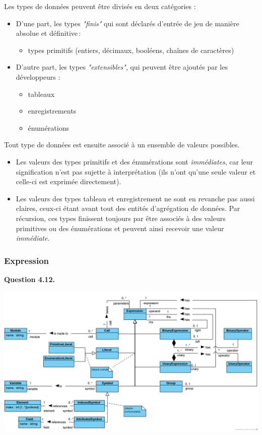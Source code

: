 \documentclass[oneside,a4paper]{book}
\begin{document}
\begin{samepage}
    Les types de données peuvent être divisés en deux catégories :
    \begin{itemize}
        \item D'une part, les types \textit{"finis"} qui sont déclarés d'entrée de jeu de manière absolue et définitive\,: 
        \begin{itemize}
            \item types primitifs (entiers, décimaux, booléens, chaînes de caractères)
        \end{itemize}
        \item D'autre part, les types \textit{"extensibles"}, qui peuvent être ajoutés par les développeurs : 
        \begin{itemize}
            \item tableaux
            \item enregistrements
            \item énumérations
        \end{itemize} 
    \end{itemize}
\end{samepage}

Tout type de données est ensuite associé à un ensemble de valeurs possibles.
\begin{itemize}
    \item Les valeurs des types primitifs et des énumérations sont \textit{immédiates}, car leur signification n'est pas sujette à interprétation (ils n'ont qu'une seule valeur et celle-ci est exprimée directement).
    \item Les valeurs des types tableau et enregistrement ne sont en revanche pas aussi claires, ceux-ci étant avant tout des entités d'agrégation de données. Par récursion, ces types finissent toujours par être associés à des valeurs primitives ou des énumérations et peuvent ainsi recevoir une valeur \textit{immédiate}.
\end{itemize}

\subsubsection{Expression}

\textbf{Question 4.12.}\label{Question 4.12.}\newline

\nopagebreak 

\includegraphics[width=\textwidth,height=\textheight,keepaspectratio]{Diagrams/DS-Expression.png}\newline
\end{document}
